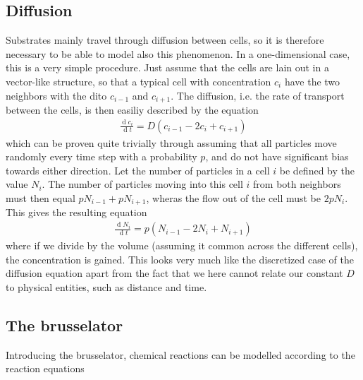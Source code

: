 \documentclass[a4paper,12pt]{article}
\renewcommand{\d}[1]{\ensuremath{\operatorname{d}\!{#1}}} %
\theoremstyle{plain}
\theoremstyle{definition}
\begin{document}
      \subsection{Diffusion}
         Substrates mainly travel through diffusion between cells, so it is
         therefore necessary to be able to model also this phenomenon. In a
         one-dimensional case, this is a very simple procedure. Just assume that
         the cells are lain out in a vector-like structure, so that a typical
         cell with concentration $c_i$ have the two neighbors with the dito $c_{i-1}$ 
         and $c_{i+1}$. The diffusion, i.e. the rate of transport between the
         cells, is then easiliy described by the equation 
            \begin{align}
               \frac{\d c_i}{\d t} = D(c_{i-1} - 2c_i + c_{i+1})
               \label{eq:diff}
            \end{align}
         which can be proven quite trivially through assuming that all particles
         move randomly every time step with a probability $p$, and do not have significant bias towards either
         direction. Let the number of particles in a cell $i$ be defined by the value $N_i$. 
         The number of particles moving into this cell $i$ from both neighbors must then 
         equal $pN_{i-1} + p N_{i+1}$, wheras the flow out of the cell must be
         $2pN_i$. This gives the resulting equation 
            \begin{align*}
               \frac{\d N_i}{\d t} = p(N_{i-1} - 2N_i + N_{i+1})
            \end{align*}
         where if we divide by the volume (assuming it common across the
         different cells), the concentration is gained. This looks very much
         like the discretized case of the diffusion equation apart from the
         fact that we here cannot relate our constant $D$ to physical
         entities, such as distance and time.



      \subsection{The brusselator}
         Introducing the brusselator, chemical reactions can be modelled
         according to the reaction equations
\end{document}
